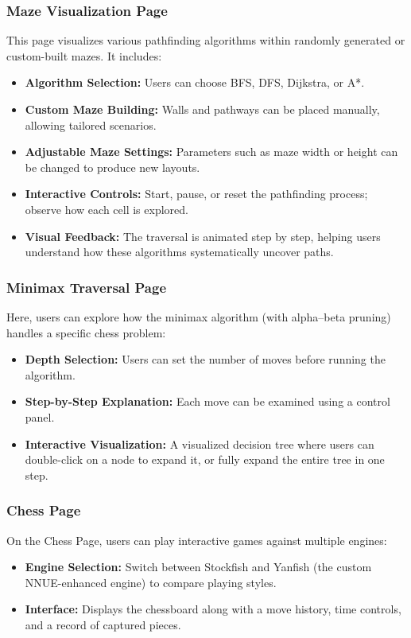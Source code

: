 \documentclass[12pt,a4paper]{article}
\begin{document}
    \subsubsection{Maze Visualization Page}
    This page visualizes various pathfinding algorithms within randomly generated or custom-built mazes. It includes:
    \begin{itemize}
      \item \textbf{Algorithm Selection:} Users can choose BFS, DFS, Dijkstra, or A*.
      \item \textbf{Custom Maze Building:} Walls and pathways can be placed manually, allowing tailored scenarios.
      \item \textbf{Adjustable Maze Settings:} Parameters such as maze width or height can be changed to produce new layouts.
      \item \textbf{Interactive Controls:} Start, pause, or reset the pathfinding process; observe how each cell is explored.
      \item \textbf{Visual Feedback:} The traversal is animated step by step, helping users understand how these algorithms systematically uncover paths.
    \end{itemize}
    
    \subsubsection{Minimax Traversal Page}
    Here, users can explore how the minimax algorithm (with alpha--beta pruning) handles a specific chess problem:
    \begin{itemize}
      \item \textbf{Depth Selection:} Users can set the number of moves before running the algorithm.
      \item \textbf{Step-by-Step Explanation:} Each move can be examined using a control panel.
      \item \textbf{Interactive Visualization:} A visualized decision tree where users can double-click on a node to expand it, or fully expand the entire tree in one step.
    \end{itemize}
    
    \subsubsection{Chess Page}
    On the Chess Page, users can play interactive games against multiple engines:
    \begin{itemize}
      \item \textbf{Engine Selection:} Switch between Stockfish and Yanfish (the custom NNUE-enhanced engine) to compare playing styles.
      \item \textbf{Interface:} Displays the chessboard along with a move history, time controls, and a record of captured pieces.
    \end{itemize}
    
\end{document}
